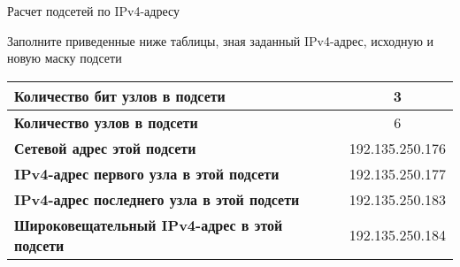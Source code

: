 \documentclass[a4paper,14pt]{extarticle}
\begin{document}
\begin{mypart}{Расчет подсетей по IPv4-адресу}
\begin{step}{Заполните приведенные ниже таблицы, зная заданный IPv4-адрес, исходную и
			новую маску подсети}
\begin{enumerate}
\begin{table}[h]
\begin{tabular}{|l|l|}
		\textbf{Количество бит узлов в подсети} & \multicolumn{1}{c|}{3} \\ \hline
		\textbf{Количество узлов в подсети} & \multicolumn{1}{c|}{6} \\ \hline
		\textbf{Сетевой адрес этой подсети} & 192.135.250.176 \\ \hline
		\textbf{IPv4-адрес первого узла в этой подсети} & 192.135.250.177 \\ \hline
		\textbf{IPv4-адрес последнего узла в этой подсети} & 192.135.250.183 \\ \hline
		\textbf{Широковещательный IPv4-адрес в этой подсети} & 192.135.250.184 \\ \hline
	\end{tabular}
	\label{}
	\end{table}

	\end{enumerate}
	\end{step}
\end{mypart}
\end{document}
